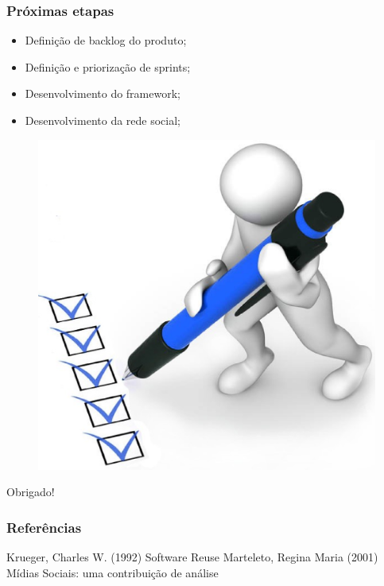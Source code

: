 \documentclass{beamer}
\begin{document}
\begin{frame}
\frametitle{Próximas etapas}

\begin{itemize}
	\item Definição de backlog do produto;
	\item Definição e priorização de sprints;
	\item Desenvolvimento do framework;
	\item Desenvolvimento da rede social;
\end{itemize}

\begin{figure}[h]
	\centering
	\includegraphics[scale=0.15]{figuras/future.eps}
\end{figure}

\end{frame}

\begin{frame}
\Huge{\centerline{Obrigado!}}
\end{frame}

\begin{frame}
\frametitle{Referências}
\footnotesize{
\begin{thebibliography}{99} %
 Krueger, Charles W. (1992)
\newblock Software Reuse
 Marteleto, Regina Maria (2001)
\newblock Mídias Sociais: uma contribuição de análise
\end{thebibliography}
}
\end{frame}
\end{document}
